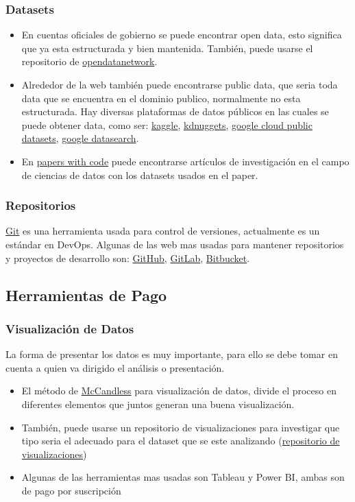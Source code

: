 \documentclass[12pt,a4paper,openright]{article}
\begin{document}
\subsubsection{Datasets}
\begin{itemize}
    \item En cuentas oficiales de gobierno se puede encontrar open data, esto significa que ya esta estructurada y bien mantenida. También, puede usarse el repositorio de \href{https://www.opendatanetwork.com/}{opendatanetwork}.
    \item Alrededor de la web también puede encontrarse public data, que seria toda data que se encuentra en el dominio publico, normalmente no esta estructurada. Hay diversas plataformas de datos públicos en las cuales se puede obtener data, como ser: \href{https://www.kaggle.com/}{kaggle}, \href{https://www.kdnuggets.com/}{kdnuggets}, \href{https://cloud.google.com/solutions/datasets}{google cloud public datasets}, \href{https://datasetsearch.research.google.com/}{google datasearch}.
    \item En \href{https://paperswithcode.com/}{papers with code} puede encontrarse artículos de investigación en el campo de ciencias de datos con los datasets usados en el paper.
\end{itemize}

\subsubsection{Repositorios}
\href{https://git-scm.com/}{Git} es una herramienta usada para control de versiones, actualmente es un estándar en DevOps. Algunas de las web mas usadas para mantener repositorios y proyectos de desarrollo son: \href{https://github.com/}{GitHub}, \href{https://about.gitlab.com/}{GitLab}, \href{https://bitbucket.org/product}{Bitbucket}.

\subsection{Herramientas de Pago}
\subsubsection{Visualizaci\'on de Datos}
La forma de presentar los datos es muy importante, para ello se debe tomar en cuenta a quien va dirigido el análisis o presentación.

\begin{itemize}
    \item El método de \href{https://www.informationisbeautiful.net/visualizations/what-makes-a-good-data-visualization/}{McCandless} para visualización de datos, divide el proceso en diferentes elementos que juntos generan una buena visualización.
    \item También, puede usarse un repositorio de visualizaciones para investigar que tipo seria el adecuado para el dataset que se este analizando (\href{https://informationisbeautiful.net/}{repositorio de visualizaciones})
    \item Algunas de las herramientas mas usadas son Tableau y Power BI, ambas son de pago por suscripción
\end{itemize}
\end{document}
